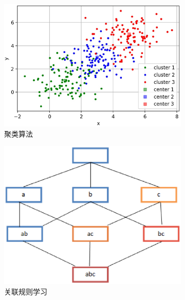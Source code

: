 \begin{figure}[htp]
	 \medskip
	 \begin{subfigure}{.33\textwidth}
	   \centering
	   \includegraphics[width=\linewidth]{imgs/2.1.7.eps}
	   \caption{聚类算法}
	   \label{fig:2.sub.7}
	 \end{subfigure}\hfil
	 \begin{subfigure}{.33\textwidth}
	   \centering
	   \includegraphics[width=\linewidth]{imgs/2.2.8.eps}
	   \caption{关联规则学习}
	   \label{fig:2.sub.8}
	 \end{subfigure}\hfil
	 \begin{subfigure}{.33\textwidth}
	   \centering

\end{subfigure}
\end{figure}
